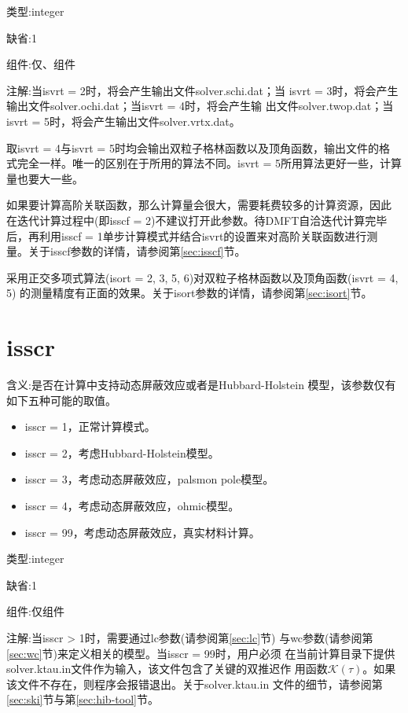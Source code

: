 {\color{green}类型}:integer

{\color{blue}缺省}:1

{\color{brown}组件}:仅{\gardenia}、{\narcissus}组件

{\color{purple}注解}:当isvrt = 2时，将会产生输出文件solver.schi.dat；当
isvrt = 3时，将会产生输出文件solver.ochi.dat；当isvrt = 4时，将会产生输
出文件solver.twop.dat；当isvrt = 5时，将会产生输出文件solver.vrtx.dat。

取isvrt = 4与isvrt = 5时均会输出双粒子格林函数以及顶角函数，输出文件的格
式完全一样。唯一的区别在于所用的算法不同。isvrt = 5所用算法更好一些，计算
量也要大一些。

如果要计算高阶关联函数，那么计算量会很大，需要耗费较多的计算资源，因此
在迭代计算过程中(即isscf = 2)不建议打开此参数。待DMFT自洽迭代计算完毕
后，再利用isscf = 1单步计算模式并结合isvrt的设置来对高阶关联函数进行测
量。关于isscf参数的详情，请参阅第\ref{sec:isscf}节。

采用正交多项式算法(isort = 2, 3, 5, 6)对双粒子格林函数以及顶角函数(isvrt = 4, 5)
的测量精度有正面的效果。关于isort参数的详情，请参阅第\ref{sec:isort}节。

\section{isscr }
\label{sec:isscr}

{\color{red}含义}:是否在计算中支持动态屏蔽效应或者是Hubbard-Holstein
模型，该参数仅有如下五种可能的取值。
\begin{itemize}
\item isscr = 1，正常计算模式。
\item isscr = 2，考虑Hubbard-Holstein模型。
\item isscr = 3，考虑动态屏蔽效应，palsmon pole模型。
\item isscr = 4，考虑动态屏蔽效应，ohmic模型。
\item isscr = 99，考虑动态屏蔽效应，真实材料计算。
\end{itemize}

{\color{green}类型}:integer

{\color{blue}缺省}:1

{\color{brown}组件}:仅{\narcissus}组件

{\color{purple}注解}:当isscr > 1时，需要通过lc参数(请参阅第\ref{sec:lc}节)
与wc参数(请参阅第\ref{sec:wc}节)来定义相关的模型。当isscr = 99时，用户必须
在当前计算目录下提供solver.ktau.in文件作为输入，该文件包含了关键的双推迟作
用函数$\mathcal{K}(\tau)$。如果该文件不存在，则程序会报错退出。关于solver.ktau.in
文件的细节，请参阅第\ref{sec:ski}节与第\ref{sec:hib-tool}节。


